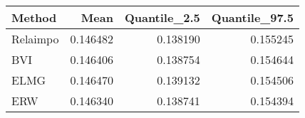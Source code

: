 \begin{table}[ht]
\centering
\begin{tabular}{lrrr}
  \hline
Method & Mean & Quantile\_2.5 & Quantile\_97.5 \\ 
  \hline
Relaimpo & 0.146482 & 0.138190 & 0.155245 \\ 
  BVI & 0.146406 & 0.138754 & 0.154644 \\ 
  ELMG & 0.146470 & 0.139132 & 0.154506 \\ 
  ERW & 0.146340 & 0.138741 & 0.154394 \\ 
   \hline
\end{tabular}
\end{table}
